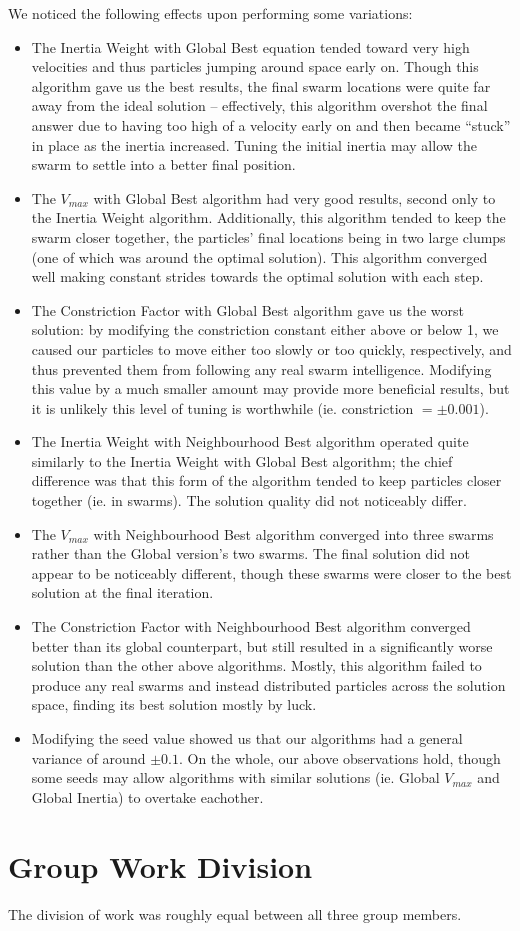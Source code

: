\documentclass[12pt]{article}
\begin{document}
We noticed the following effects upon performing some variations:
\begin{itemize}
\item The Inertia Weight with Global Best equation tended toward very high velocities and thus particles jumping around space early on. Though this algorithm gave us the best results, the final swarm locations were quite far away from the ideal solution -- effectively, this algorithm overshot the final answer due to having too high of a velocity early on and then became ``stuck'' in place as the inertia increased. Tuning the initial inertia may allow the swarm to settle into a better final position.
\item The $V_{max}$ with Global Best algorithm had very good results, second only to the Inertia Weight algorithm. Additionally, this algorithm tended to keep the swarm closer together, the particles' final locations being in two large clumps (one of which was around the optimal solution). This algorithm converged well making constant strides towards the optimal solution with each step.
\item The Constriction Factor with Global Best algorithm gave us the worst solution: by modifying the constriction constant either above or below 1, we caused our particles to move either too slowly or too quickly, respectively, and thus prevented them from following any real swarm intelligence. Modifying this value by a much smaller amount may provide more beneficial results, but it is unlikely this level of tuning is worthwhile (ie. constriction $= \pm 0.001$).
\item The Inertia Weight with Neighbourhood Best algorithm operated quite similarly to the Inertia Weight with Global Best algorithm; the chief difference was that this form of the algorithm tended to keep particles closer together (ie. in swarms). The solution quality did not noticeably differ.
\item The $V_{max}$ with Neighbourhood Best algorithm converged into three swarms rather than the Global version's two swarms. The final solution did not appear to be noticeably different, though these swarms were closer to the best solution at the final iteration.
\item The Constriction Factor with Neighbourhood Best algorithm converged better than its global counterpart, but still resulted in a significantly worse solution than the other above algorithms. Mostly, this algorithm failed to produce any real swarms and instead distributed particles across the solution space, finding its best solution mostly by luck.
\item Modifying the seed value showed us that our algorithms had a general variance of around $\pm 0.1$. On the whole, our above observations hold, though some seeds may allow algorithms with similar solutions (ie. Global $V_{max}$ and Global Inertia) to overtake eachother.
\end{itemize}

\section*{Group Work Division}
The division of work was roughly equal between all three group members.
\end{document}
